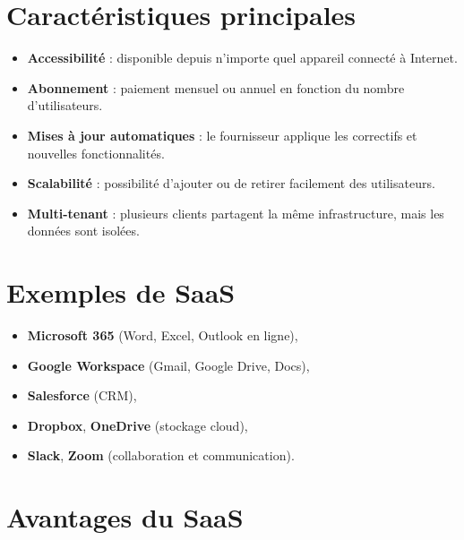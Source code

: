 \documentclass[a4paper,11pt]{article}
\begin{document}
\section*{Caractéristiques principales}

\begin{tcolorbox}[title={Propriétés du SaaS}]
\begin{itemize}
  \item \textbf{Accessibilité} : disponible depuis n’importe quel appareil connecté à Internet.
  \item \textbf{Abonnement} : paiement mensuel ou annuel en fonction du nombre d’utilisateurs.
  \item \textbf{Mises à jour automatiques} : le fournisseur applique les correctifs et nouvelles fonctionnalités.
  \item \textbf{Scalabilité} : possibilité d’ajouter ou de retirer facilement des utilisateurs.
  \item \textbf{Multi-tenant} : plusieurs clients partagent la même infrastructure, mais les données sont isolées.
\end{itemize}
\end{tcolorbox}

\section*{Exemples de SaaS}

\begin{tcolorbox}[title={Applications courantes}]
\begin{itemize}
  \item \textbf{Microsoft 365} (Word, Excel, Outlook en ligne),
  \item \textbf{Google Workspace} (Gmail, Google Drive, Docs),
  \item \textbf{Salesforce} (CRM),
  \item \textbf{Dropbox}, \textbf{OneDrive} (stockage cloud),
  \item \textbf{Slack}, \textbf{Zoom} (collaboration et communication).
\end{itemize}
\end{tcolorbox}

\section*{Avantages du SaaS}
\end{document}

